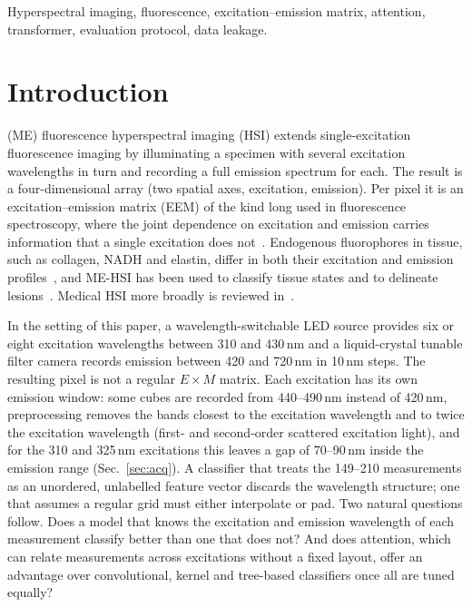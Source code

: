 \documentclass[journal]{IEEEtran}
\begin{document}
\begin{IEEEkeywords}
Hyperspectral imaging, fluorescence, excitation--emission matrix, attention, transformer, evaluation protocol, data leakage.
\end{IEEEkeywords}

\section{Introduction}
 (ME) fluorescence hyperspectral imaging (HSI) extends single-excitation fluorescence imaging by illuminating a specimen with several excitation wavelengths in turn and recording a full emission spectrum for each. The result is a four-dimensional array (two spatial axes, excitation, emission). Per pixel it is an excitation--emission matrix (EEM) of the kind long used in fluorescence spectroscopy, where the joint dependence on excitation and emission carries information that a single excitation does not~\cite{murphy2013parafac,bro1997parafac}. Endogenous fluorophores in tissue, such as collagen, NADH and elastin, differ in both their excitation and emission profiles~\cite{croce2014autofluorescence,monici2005autofluorescence}, and ME-HSI has been used to classify tissue states and to delineate lesions~\cite{gabrielyan2025access,hunanyan2025atrial,terpetrosyan2025configs}. Medical HSI more broadly is reviewed in~\cite{lu2014medical}.

In the setting of this paper, a wavelength-switchable LED source provides six or eight excitation wavelengths between 310 and 430\,nm and a liquid-crystal tunable filter camera records emission between 420 and 720\,nm in 10\,nm steps. The resulting pixel is not a regular $E\times M$ matrix. Each excitation has its own emission window: some cubes are recorded from 440--490\,nm instead of 420\,nm, preprocessing removes the bands closest to the excitation wavelength and to twice the excitation wavelength (first- and second-order scattered excitation light), and for the 310 and 325\,nm excitations this leaves a gap of 70--90\,nm inside the emission range (Sec.~\ref{sec:acq}). A classifier that treats the 149--210 measurements as an unordered, unlabelled feature vector discards the wavelength structure; one that assumes a regular grid must either interpolate or pad. Two natural questions follow. Does a model that knows the excitation and emission wavelength of each measurement classify better than one that does not? And does attention, which can relate measurements across excitations without a fixed layout, offer an advantage over convolutional, kernel and tree-based classifiers once all are tuned equally?
\end{document}
